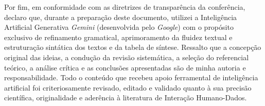 \documentclass[12pt]{article}
\begin{document}
Por fim, em conformidade com as diretrizes de transparência da conferência, declaro que, durante a preparação deste documento, utilizei a Inteligência Artificial Generativa \textit{Gemini} (desenvolvida pelo \textit{Google}) com o propósito exclusivo de refinamento gramatical, aprimoramento da fluidez textual e estruturação sintática dos textos e da tabela de síntese. Ressalto que a concepção original das ideias, a condução da revisão sistemática, a seleção do referencial teórico, a análise crítica e as conclusões apresentadas são de minha autoria e responsabilidade. Todo o conteúdo que recebeu apoio ferramental de inteligência artificial foi criteriosamente revisado, editado e validado quanto à sua precisão científica, originalidade e aderência à literatura de Interação Humano-Dados.



\end{document}
